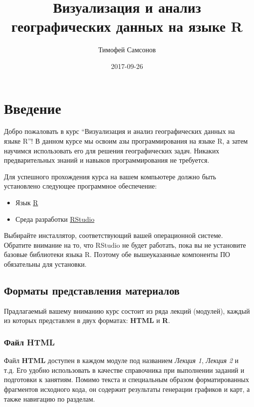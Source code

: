 \documentclass[]{book}
\title{Визуализация и анализ географических данных на языке R}
\author{Тимофей Самсонов}
\date{2017-09-26}
\providecommand{\tightlist}{%
  \setlength{\itemsep}{0pt}\setlength{\parskip}{0pt}}
\begin{document}
\maketitle

{
\setcounter{tocdepth}{1}
\tableofcontents
}
\chapter*{Введение}

Добро пожаловать в курс ``Визуализация и анализ географических данных на
языке R''! В данном курсе мы освоим азы программирования на языке R, а
затем научимся использовать его для решения географических задач.
Никаких предварительных знаний и навыков программирования не требуется.

Для успешного прохождения курса на вашем компьютере должно быть
установлено следующее программное обеспечение:

\begin{itemize}
\tightlist
\item
  Язык \href{https://cran.r-project.org}{R}
\item
  Среда разработки
  \href{https://www.rstudio.com/products/rstudio/download3/}{RStudio}
\end{itemize}

Выбирайте инсталлятор, соответствующий вашей операционной системе.
Обратите внимание на то, что RStudio не будет работать, пока вы не
установите базовые библиотеки языка R. Поэтому обе вышеуказанные
компоненты ПО обязательны для установки.

\section*{Форматы представления материалов}\label{--}

Прадлагаемый вашему вниманию курс состоит из ряда лекций (модулей),
каждый из которых представлен в двух форматах: \textbf{HTML} и
\textbf{R}.

\subsection*{Файл HTML}\label{-html}

Файл \textbf{HTML} доступен в каждом модуле под названием \emph{Лекция
1}, \emph{Лекция 2} и т.д. Его удобно использовать в качестве
справочника при выполнении заданий и подготовки к занятиям. Помимо
текста и специальным образом форматированных фрагментов исходного кода,
он содержит результаты генерации графиков и карт, а также навигацию по
разделам.
\end{document}

